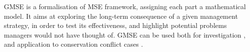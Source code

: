 \documentclass[12pt,a4paper]{article}
\begin{document}
GMSE is a formalisation of MSE framework, assigning each part a mathematical model.
It aims at exploring the long-term consequence of a given management strategy, in order to test its effectiveness, and highlight potential problems managers would not have thought of.
GMSE can be used both for investigation \citep{cusack2018time}, and application to conservation conflict cases \citep{bainbridge2017goose}.\\
\end{document}
